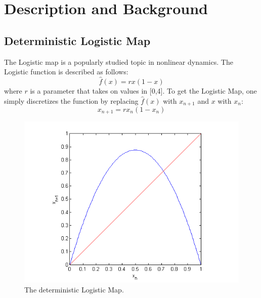 \documentclass[12pt]{article}
\begin{document}
\section{Description and Background}
\subsection{Deterministic Logistic Map}
The Logistic map is a popularly studied topic in nonlinear
dynamics. The Logistic function is described as follows:
\begin{equation}\label{orig}
\hat{f}(x) = rx(1-x)
\end{equation}
where $r$ is a parameter that takes on values in [0,4]. To get the
Logistic Map, one simply discretizes the function by replacing
$\hat{f}(x)$ with $x_{n+1}$ and $x$ with $x_n$:
\begin{equation*}
x_{n+1}=rx_n(1-x_n)
\end{equation*}
\begin{figure}[H]
	\begin{center}
		\includegraphics[scale=0.7]{deterministic}
\caption{The deterministic Logistic Map.}
	\end{center}
\end{figure}
\end{document}
